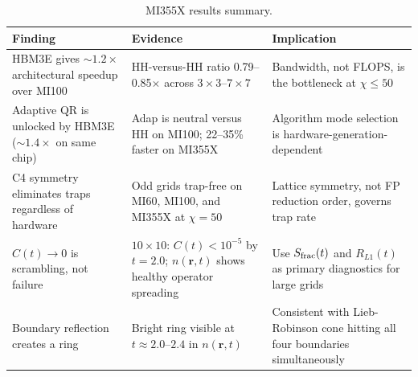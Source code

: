 \begin{table}[ht]
\centering
\caption{MI355X results summary.}
\label{tab:mi355x_summary}
\smallskip
\small
\begin{tabular}{p{3.8cm} p{4.0cm} p{4.4cm}}
\toprule
\textbf{Finding} & \textbf{Evidence} & \textbf{Implication} \\
\midrule
HBM3E gives ${\sim}1.2\times$ architectural speedup over MI100
  & HH-versus-HH ratio 0.79--0.85$\times$ across $3\times3$--$7\times7$
  & Bandwidth, not FLOPS, is the bottleneck at $\chi \leq 50$ \\[4pt]

Adaptive QR is unlocked by HBM3E (${\sim}1.4\times$ on same chip)
  & Adap is neutral versus HH on MI100; 22--35\% faster on MI355X
  & Algorithm mode selection is hardware-generation-dependent \\[4pt]

C4 symmetry eliminates traps regardless of hardware
  & Odd grids trap-free on MI60, MI100, and MI355X at $\chi=50$
  & Lattice symmetry, not FP reduction order, governs trap rate \\[4pt]

$C(t)\to 0$ is scrambling, not failure
  & $10\times10$: $C(t) < 10^{-5}$ by $t=2.0$; $n(\mathbf{r},t)$ shows
    healthy operator spreading
  & Use $S_{\rm frac}(t)$ and $R_{L1}(t)$ as primary diagnostics for large grids \\[4pt]

Boundary reflection creates a ring
  & Bright ring visible at $t \approx 2.0$--$2.4$ in $n(\mathbf{r},t)$
  & Consistent with Lieb-Robinson cone hitting all four boundaries simultaneously \\
\bottomrule
\end{tabular}
\end{table}
